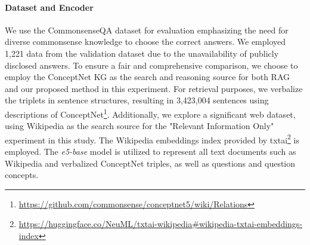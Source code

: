 \documentclass{article}
\begin{document}
\paragraph{\textbf{Dataset and Encoder}} We use the CommonsenseQA dataset \citep{talmor2018commonsenseqa} for evaluation emphasizing the need for diverse commonsense knowledge to choose the correct answers. We employed 1,221 data from the validation dataset due to the unavailability of publicly disclosed answers.
To ensure a fair and comprehensive comparison, we choose to employ the ConceptNet KG as the search and reasoning source for both RAG and our proposed method in this experiment. For retrieval purposes, we verbalize the triplets in sentence structures, resulting in 3,423,004 sentences using descriptions of ConceptNet\footnote{\url{https://github.com/commonsense/conceptnet5/wiki/Relations}}. Additionally, we explore a significant web dataset, using Wikipedia as the search source for the "Relevant Information Only" experiment in this study. The Wikipedia embeddings index provided by txtai\footnote{\url{https://huggingface.co/NeuML/txtai-wikipedia\#wikipedia-txtai-embeddings-index}} is employed. The \textit{e5-base} model \citep{wang2022text} is utilized to represent all text documents such as Wikipedia and verbalized ConceptNet triples, as well as questions and question concepts.
\end{document}
